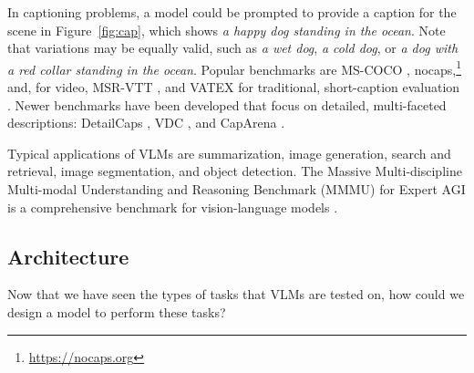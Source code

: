 In captioning problems, a model  could be prompted to provide a caption for the scene in Figure~\ref{fig:cap}, which shows {\em a happy dog standing in the ocean}. Note that variations may be equally valid, such as {\em a wet dog}, {\em a cold dog}, or {\em a dog with a red collar standing in the ocean}. Popular benchmarks are  MS-COCO \citep{lin2014microsoft}, nocaps,\footnote{\url{https://nocaps.org}} and, for video,  MSR-VTT \citep{xu2016msr}, and VATEX  for traditional, short-caption evaluation \citep{wang2019vatex}. Newer benchmarks have been developed that focus on detailed, multi-faceted descriptions:  DetailCaps \citep{dong2024benchmarking},   VDC \citep{chai2024auroracap}, and CapArena \citep{cheng2025caparena}. %

Typical applications of VLMs are summarization, image generation, search and retrieval, image segmentation, and object detection. The Massive Multi-discipline Multi-modal Understanding and Reasoning Benchmark (MMMU) for Expert AGI  is a comprehensive benchmark for vision-language models \citep{yue2024mmmu}. 





\subsection{Architecture}
Now that we have seen the types of tasks that VLMs are tested on, how could we design a model to perform these tasks? %

